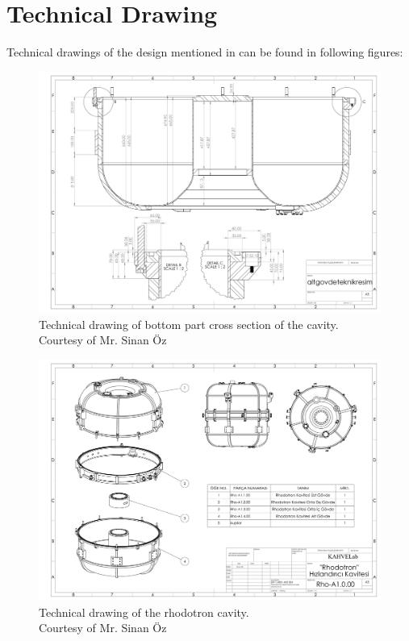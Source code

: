\documentclass[a4paper,oneside,12pt]{report}
\numberwithin{equation}{chapter}
\begin{document}
\section{Technical Drawing}
Technical drawings of the design mentioned in  can be found in following figures:
\begin{figure}[H]
    \centering
    \includegraphics[width=1\linewidth]{./figures/teknikcizim/altgovdeteknikresim.pdf}
    \caption{Technical drawing of bottom part cross section of the cavity. \\ Courtesy of Mr. Sinan Öz}
\end{figure}

\begin{figure}
    \centering
    \includegraphics[angle=270,origin=c, width=.98\linewidth]{./figures/teknikcizim/Rho-A1.0.00.pdf}
    \caption{Technical drawing of the rhodotron cavity. \\ Courtesy of Mr. Sinan Öz}
\end{figure}
\end{document}
